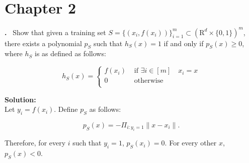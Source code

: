 \documentclass{article}
\newcounter{problem}
\newcounter{solution}
\newcommand\Problem{%
  \stepcounter{problem}%
  \textbf{\theproblem.}~%
  \setcounter{solution}{0}%
}
\newcommand\TheSolution{%
  \textbf{Solution:}\\%
}
\begin{document}
\section{Chapter 2}
\Problem Show that given a training set $S=\{(x_i, f(x_i))\}_{i=1}^m \subset (\mathrm{R}^d \times \{0, 1\})^m$, there exists a polynomial $p_S$ such that
$h_S(x) = 1$ if and only if $p_S(x) \geq 0$, where $h_S$ is as defined as follows:

\begin{equation}
    h_S(x) = 
    \left\{
    \begin{array}{ll}
    f(x_i) & \textrm{ if } \exists i \in [m] \quad x_i = x \\
    0 & \textrm{ otherwise} \\
    \end{array}
    \right.
\end{equation}

\TheSolution 
Let $y_i = f(x_i)$. Define $p_S$ as follows:

\begin{equation}
    p_S(x) = - \Pi_{i:y_i=1}\|x - x_i\|.
\end{equation}

Therefore, for every $i$ such that $y_i = 1$, $p_S(x_i) = 0$. For every other $x$, $p_S(x) < 0$.
\end{document}
